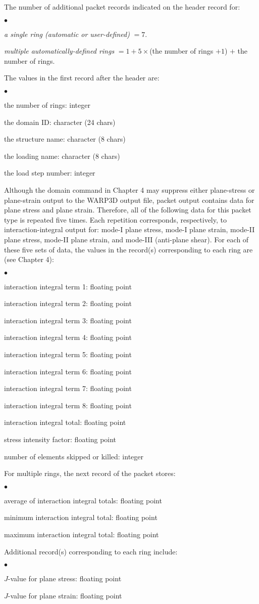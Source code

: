 \documentclass[10pt]{report}
\numberwithin{equation}{section}
\newcommand{\ti}{\emph}
\newcommand{\squishlist}{
 \begin{list}{$\bullet$}
  { \setlength{\itemsep}{0pt}
     \setlength{\parsep}{3pt}
     \setlength{\topsep}{3pt}
     \setlength{\partopsep}{0pt}
     \setlength{\leftmargin}{1.5em}
     \setlength{\labelwidth}{1em}
     \setlength{\labelsep}{0.5em} } }
\newcommand{\squishend}{
  \end{list}  }
\begin{document}
\noindent The number of additional packet records indicated on the header record for:
\squishlist
\item \ti{a single ring (automatic or user-defined)} $= 7$.
\item \ti{multiple automatically-defined rings} $= 1 + 5 \times$(the number of 
rings $+1$) $+$ the number of rings.
\squishend
\noindent The values in the first record after the header are:
\squishlist
\item the number of rings: integer
\item the domain ID: character (24 chars)
\item the structure name: character (8 chars)
\item the loading name: character (8 chars)
\item the load step number: integer
\squishend
\noindent Although the domain command in Chapter 4 may suppress either plane-stress 
or plane-strain output to the WARP3D output file, packet output 
contains data for plane stress and plane strain. Therefore, all of the 
following data for this packet type is repeated five times. Each 
repetition corresponds, respectively, to interaction-integral output for: 
mode-I plane stress, mode-I plane strain, mode-II plane stress, 
mode-II plane strain, and mode-III (anti-plane shear). For each of 
these five sets of data, the values in the record(s) corresponding to 
each ring are (see Chapter 4):   
\squishlist
\item interaction integral term 1:  floating point
\item interaction integral term 2:  floating point
\item interaction integral term 3:  floating point
\item interaction integral term 4:  floating point
\item interaction integral term 5:  floating point
\item interaction integral term 6:  floating point
\item interaction integral term 7:  floating point
\item interaction integral term 8:  floating point
\item interaction integral total:  floating point
\item stress intensity factor:  floating point
\item number of elements skipped or killed:  integer
\squishend
\noindent For multiple rings, the next record of the packet stores:
\squishlist
\item average of interaction integral totals:  floating point
\item minimum interaction integral total:  floating point
\item maximum interaction integral total:  floating point
\squishend
\noindent Additional record(s) corresponding to each ring include:  
\squishlist
\item $J$-value for plane stress: floating point
\item $J$-value for plane strain: floating point
\squishend
\end{document}
